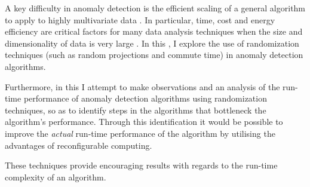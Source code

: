 A key difficulty in anomaly detection is the efficient scaling of a general
algorithm to apply to highly multivariate data \citeNeeded{}. In particular,
time, cost and energy efficiency are critical factors for many data analysis
techniques when the size and dimensionality of data is very large
\cite{Vries:2011}. In this \thesis{}, I explore the use of randomization
techniques (such as random projections and commute time) in anomaly detection
algorithms.

Furthermore, in this \thesis{} I attempt to make observations and an analysis of
the run-time performance of anomaly detection algorithms using randomization
techniques, so as to identify steps in the algorithms that bottleneck the
algorithm's performance. Through this identification it would be possible to
improve the \emph{actual} run-time performance of the algorithm by utilising the
advantages of reconfigurable computing.

These techniques provide encouraging results with regards to the run-time
complexity of an algorithm.
